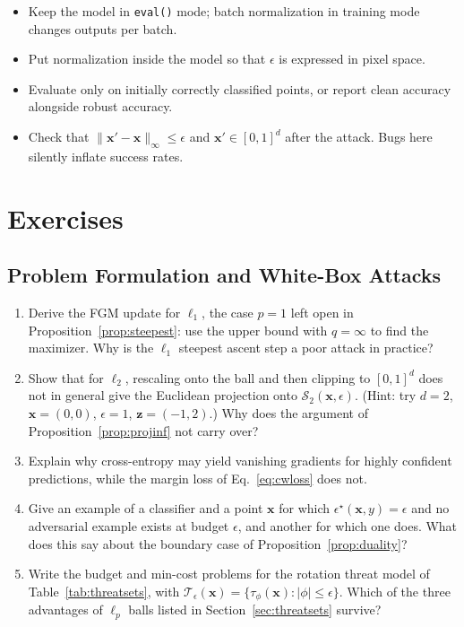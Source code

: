 \documentclass[10pt,a4paper]{extarticle}
\theoremstyle{definition}
\newcommand{\x}{\mathbf{x}}
\newcommand{\xadv}{\mathbf{x}'}
\newcommand{\T}{\mathcal{T}}
\begin{document}
\begin{warnbox}
\begin{itemize}
  \item Keep the model in \texttt{eval()} mode; batch normalization in training mode changes outputs per batch.
  \item Put normalization inside the model so that \(\epsilon\) is expressed in pixel space.
  \item Evaluate only on initially correctly classified points, or report clean accuracy alongside robust accuracy.
  \item Check that \(\|\xadv-\x\|_\infty\le\epsilon\) and \(\xadv\in[0,1]^d\) after the attack. Bugs here silently inflate success rates.
\end{itemize}
\end{warnbox}

\section*{Exercises}

\subsection*{Problem Formulation and White-Box Attacks}

\begin{enumerate}[label=\textbf{\arabic*.}]
  \item\label{ex:l1} Derive the FGM update for \(\ell_1\), the case \(p=1\) left open in Proposition~\ref{prop:steepest}: use the upper bound with \(q=\infty\) to find the maximizer. Why is the \(\ell_1\) steepest ascent step a poor attack in practice?
  \item\label{ex:proj} Show that for \(\ell_2\), rescaling onto the ball and then clipping to \([0,1]^d\) does not in general give the Euclidean projection onto \(\mathcal{S}_2(\x,\epsilon)\). (Hint: try \(d=2\), \(\x=(0,0)\), \(\epsilon=1\), \(\mathbf{z}=(-1,2)\).) Why does the argument of Proposition~\ref{prop:projinf} not carry over?
  \item Explain why cross-entropy may yield vanishing gradients for highly confident predictions, while the margin loss of Eq.~\eqref{eq:cwloss} does not.
  \item Give an example of a classifier and a point \(\x\) for which \(\epsilon^\star(\x,y)=\epsilon\) and no adversarial example exists at budget \(\epsilon\), and another for which one does. What does this say about the boundary case of Proposition~\ref{prop:duality}?
  \item Write the budget and min-cost problems for the rotation threat model of Table~\ref{tab:threatsets}, with \(\T_\epsilon(\x)=\{\tau_\phi(\x):|\phi|\le\epsilon\}\). Which of the three advantages of \(\ell_p\) balls listed in Section~\ref{sec:threatsets} survive?
\end{enumerate}
\end{document}
